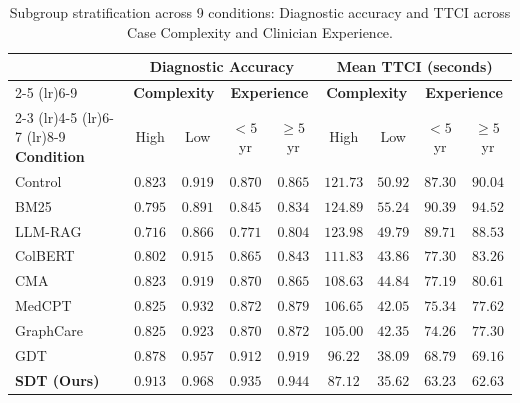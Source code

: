 \documentclass[10pt, onecolumn]{article}
\begin{document}
\begin{table}[t]
  \centering
  \caption{Subgroup stratification across 9 conditions: Diagnostic accuracy and TTCI across Case Complexity and Clinician Experience.}
  \label{tab:subgroup_results}
  \small
  \begin{tabular}{@{}lcccccccc@{}}
    \toprule
    & \multicolumn{4}{c}{\textbf{Diagnostic Accuracy}} & \multicolumn{4}{c}{\textbf{Mean TTCI (seconds)}} \\
    \cmidrule(lr){2-5} \cmidrule(lr){6-9}
    & \multicolumn{2}{c}{\textbf{Complexity}} & \multicolumn{2}{c}{\textbf{Experience}} & \multicolumn{2}{c}{\textbf{Complexity}} & \multicolumn{2}{c}{\textbf{Experience}} \\
    \cmidrule(lr){2-3} \cmidrule(lr){4-5} \cmidrule(lr){6-7} \cmidrule(lr){8-9}
    \textbf{Condition} & High & Low & $<5$\,yr & $\ge 5$\,yr & High & Low & $<5$\,yr & $\ge 5$\,yr \\
    \midrule
    Control   & $0.823$ & $0.919$ & $0.870$ & $0.865$ & $121.73$ & $50.92$ & $87.30$ & $90.04$ \\
    BM25      & $0.795$ & $0.891$ & $0.845$ & $0.834$ & $124.89$ & $55.24$ & $90.39$ & $94.52$ \\
    LLM-RAG   & $0.716$ & $0.866$ & $0.771$ & $0.804$ & $123.98$ & $49.79$ & $89.71$ & $88.53$ \\
    ColBERT   & $0.802$ & $0.915$ & $0.865$ & $0.843$ & $111.83$ & $43.86$ & $77.30$ & $83.26$ \\
    CMA       & $0.823$ & $0.919$ & $0.870$ & $0.865$ & $108.63$ & $44.84$ & $77.19$ & $80.61$ \\
    MedCPT    & $0.825$ & $0.932$ & $0.872$ & $0.879$ & $106.65$ & $42.05$ & $75.34$ & $77.62$ \\
    GraphCare & $0.825$ & $0.923$ & $0.870$ & $0.872$ & $105.00$ & $42.35$ & $74.26$ & $77.30$ \\
    GDT       & $0.878$ & $0.957$ & $0.912$ & $0.919$ & $96.22$  & $38.09$ & $68.79$ & $69.16$ \\
    \textbf{SDT (Ours)} & $\mathbf{0.913}$ & $\mathbf{0.968}$ & $\mathbf{0.935}$ & $\mathbf{0.944}$ & $\mathbf{87.12}$ & $\mathbf{35.62}$ & $\mathbf{63.23}$ & $\mathbf{62.63}$ \\
    \bottomrule
  \end{tabular}
\end{table}
\end{document}
